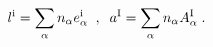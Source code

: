 \begin{equation}
l^{\rm i}=\sum_\alpha n_\alpha {e_\alpha^{\rm i}} \;\;,\;\;
a^{\rm I}=\sum_\alpha n_\alpha A_\alpha^{\rm I} \;.
\end{equation}

